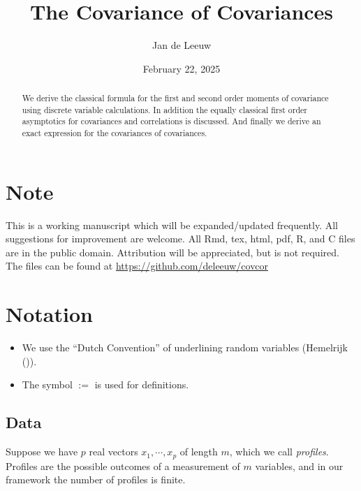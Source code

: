\documentclass[
  12pt,
  letterpaper,
  DIV=11,
  numbers=noendperiod]{scrartcl}
\title{The Covariance of Covariances}
\author{Jan de Leeuw}
\date{February 22, 2025}
\providecommand{\tightlist}{%
  \setlength{\itemsep}{0pt}\setlength{\parskip}{0pt}}\usepackage{longtable,booktabs,array}
\newcommand{\sectionbreak}{\clearpage}
\renewcommand*\contentsname{Table of contents}
\newcommand\contentsname{Table of contents}
\begin{document}
\maketitle
\begin{abstract}
We derive the classical formula for the first and second order moments
of covariance using discrete variable calculations. In addition the
equally classical first order asymptotics for covariances and
correlations is discussed. And finally we derive an exact expression for
the covariances of covariances.
\end{abstract}

\renewcommand*\contentsname{Table of contents}
{
\hypersetup{linkcolor=}
\setcounter{tocdepth}{3}
\tableofcontents
}

\section*{Note}\label{note}

This is a working manuscript which will be expanded/updated frequently.
All suggestions for improvement are welcome. All Rmd, tex, html, pdf, R,
and C files are in the public domain. Attribution will be appreciated,
but is not required. The files can be found at
\url{https://github.com/deleeuw/covcor}

\section*{Notation}\label{notation}

\begin{itemize}
\tightlist
\item
  We use the ``Dutch Convention'' of underlining random variables
  (Hemelrijk ()).
\item
  The symbol \(:=\) is used for definitions.
\end{itemize}

\sectionbreak

\subsection{Data}\label{data}

Suppose we have \(p\) real vectors \(x_1,\cdots,x_p\) of length \(m\),
which we call \emph{profiles}. Profiles are the possible outcomes of a
measurement of \(m\) variables, and in our framework the number of
profiles is finite.
\end{document}
